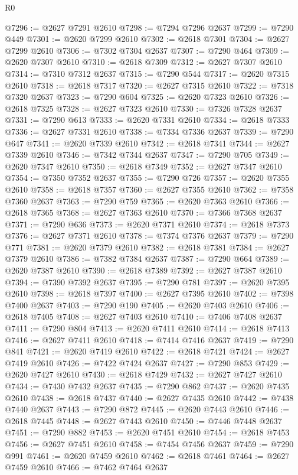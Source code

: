 \begin{lexlean}{R0}
\begin{coremodule}
@7296 := @2627 @7291 @2610
@7298 := @7294 @7296 @2637
@7299 := @7290 @449
@7301 := @2620 @7299 @2610
@7302 := @2618 @7301
@7304 := @2627 @7299 @2610
@7306 := @7302 @7304 @2637
@7307 := @7290 @464
@7309 := @2620 @7307 @2610
@7310 := @2618 @7309
@7312 := @2627 @7307 @2610
@7314 := @7310 @7312 @2637
@7315 := @7290 @544
@7317 := @2620 @7315 @2610
@7318 := @2618 @7317
@7320 := @2627 @7315 @2610
@7322 := @7318 @7320 @2637
@7323 := @7290 @604
@7325 := @2620 @7323 @2610
@7326 := @2618 @7325
@7328 := @2627 @7323 @2610
@7330 := @7326 @7328 @2637
@7331 := @7290 @613
@7333 := @2620 @7331 @2610
@7334 := @2618 @7333
@7336 := @2627 @7331 @2610
@7338 := @7334 @7336 @2637
@7339 := @7290 @647
@7341 := @2620 @7339 @2610
@7342 := @2618 @7341
@7344 := @2627 @7339 @2610
@7346 := @7342 @7344 @2637
@7347 := @7290 @705
@7349 := @2620 @7347 @2610
@7350 := @2618 @7349
@7352 := @2627 @7347 @2610
@7354 := @7350 @7352 @2637
@7355 := @7290 @726
@7357 := @2620 @7355 @2610
@7358 := @2618 @7357
@7360 := @2627 @7355 @2610
@7362 := @7358 @7360 @2637
@7363 := @7290 @759
@7365 := @2620 @7363 @2610
@7366 := @2618 @7365
@7368 := @2627 @7363 @2610
@7370 := @7366 @7368 @2637
@7371 := @7290 @636
@7373 := @2620 @7371 @2610
@7374 := @2618 @7373
@7376 := @2627 @7371 @2610
@7378 := @7374 @7376 @2637
@7379 := @7290 @771
@7381 := @2620 @7379 @2610
@7382 := @2618 @7381
@7384 := @2627 @7379 @2610
@7386 := @7382 @7384 @2637
@7387 := @7290 @664
@7389 := @2620 @7387 @2610
@7390 := @2618 @7389
@7392 := @2627 @7387 @2610
@7394 := @7390 @7392 @2637
@7395 := @7290 @781
@7397 := @2620 @7395 @2610
@7398 := @2618 @7397
@7400 := @2627 @7395 @2610
@7402 := @7398 @7400 @2637
@7403 := @7290 @190
@7405 := @2620 @7403 @2610
@7406 := @2618 @7405
@7408 := @2627 @7403 @2610
@7410 := @7406 @7408 @2637
@7411 := @7290 @804
@7413 := @2620 @7411 @2610
@7414 := @2618 @7413
@7416 := @2627 @7411 @2610
@7418 := @7414 @7416 @2637
@7419 := @7290 @841
@7421 := @2620 @7419 @2610
@7422 := @2618 @7421
@7424 := @2627 @7419 @2610
@7426 := @7422 @7424 @2637
@7427 := @7290 @853
@7429 := @2620 @7427 @2610
@7430 := @2618 @7429
@7432 := @2627 @7427 @2610
@7434 := @7430 @7432 @2637
@7435 := @7290 @862
@7437 := @2620 @7435 @2610
@7438 := @2618 @7437
@7440 := @2627 @7435 @2610
@7442 := @7438 @7440 @2637
@7443 := @7290 @872
@7445 := @2620 @7443 @2610
@7446 := @2618 @7445
@7448 := @2627 @7443 @2610
@7450 := @7446 @7448 @2637
@7451 := @7290 @882
@7453 := @2620 @7451 @2610
@7454 := @2618 @7453
@7456 := @2627 @7451 @2610
@7458 := @7454 @7456 @2637
@7459 := @7290 @991
@7461 := @2620 @7459 @2610
@7462 := @2618 @7461
@7464 := @2627 @7459 @2610
@7466 := @7462 @7464 @2637

\end{coremodule}
\end{lexlean}
